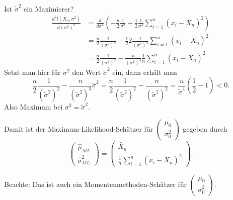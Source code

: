 \documentclass{tstextbook}
\begin{document}
\begin{example}
	Ist $ \tilde{\sigma}^2 $ ein Maximierer?
	\[
	\begin{aligned}
		\frac{d^2l\left(\bar{X}_n,\sigma^2\right)}{d\left(\sigma^2\right)^2} & = \frac{d}{d\sigma^2}\left(-\frac{n}{2}\frac{1}{\sigma^2}+\frac{1}{2}\frac{1}{\sigma^4}\sum_{i=1}^{n}(x_i-\bar{X}_n)^2\right) \\
		& = \frac{n}{2}\frac{1}{\left(\sigma^2\right)^2}-\frac{1}{2}2\frac{1}{\left(\sigma^2\right)^3}\sum_{i=1}^{n}(x_i-\bar{X}_n)^2 \\
		& = \frac{n}{2}\frac{1}{\left(\sigma^2\right)^2}-\frac{n}{\left(\sigma^2\right)^3}\frac{1}{n}\sum_{i=1}^{n}(x_i-\bar{X}_n)^2
	\end{aligned}
	\]
	Setzt man hier für $ \sigma^2 $ den Wert $ \tilde{\sigma}^2 $ ein, dann erhält man 
	\[
	\frac{n}{2}\frac{1}{\left(\tilde{\sigma}^2\right)^2}-\frac{n}{\left(\tilde{\sigma}^2\right)^3}\tilde{\sigma}^2 = \frac{n}{2}\frac{1}{\left(\tilde{\sigma}^2\right)^2}-\frac{n}{\left(\tilde{\sigma}^2\right)^2} = \frac{n}{\tilde{\sigma}^4}\left(\frac{1}{2}-1\right) < 0.
	\]
	Also Maximum bei $ \sigma^2 = \tilde{\sigma}^2 $.
	
	Damit ist der Maximum-Likelihood-Schätzer für $ \begin{pmatrix}
		\mu_0 \\ \sigma_0^2
	\end{pmatrix} $ gegeben durch 
	\[
	\begin{pmatrix}
		\hat{\mu}_{ML} \\ \hat{\sigma}_{ML}^2
	\end{pmatrix} = \begin{pmatrix}
	\bar{X}_n \\ \frac{1}{n} \sum_{i=1}^{n}(x_i-\bar{X}_n)^2
\end{pmatrix}.
	\]
	
	Beachte: Das ist auch ein Momentenmethoden-Schätzer für $ \begin{pmatrix}
		\mu_0 \\ \sigma_0^2
	\end{pmatrix} $.
	
\end{example}
\end{document}
